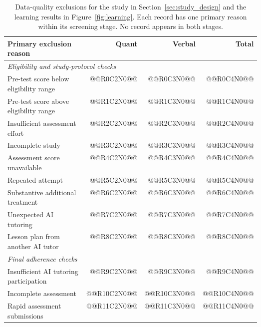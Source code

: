 \begin{table}[H]\centering
\caption{Data-quality exclusions for the study in Section~\ref{sec:study_design} and the learning results in Figure~\ref{fig:learning}. Each record has one primary reason within its screening stage. No record appears in both stages.}\label{tab:data_quality}
\begin{tabular}{p{0.59\linewidth}rrr}\toprule
Primary exclusion reason & Quant & Verbal & Total\\\midrule
\multicolumn{4}{l}{\textit{Eligibility and study-protocol checks}}\\
Pre-test score below eligibility range & @@R0C2N0@@ & @@R0C3N0@@ & @@R0C4N0@@\\
Pre-test score above eligibility range & @@R1C2N0@@ & @@R1C3N0@@ & @@R1C4N0@@\\
Insufficient assessment effort & @@R2C2N0@@ & @@R2C3N0@@ & @@R2C4N0@@\\
Incomplete study & @@R3C2N0@@ & @@R3C3N0@@ & @@R3C4N0@@\\
Assessment score unavailable & @@R4C2N0@@ & @@R4C3N0@@ & @@R4C4N0@@\\
Repeated attempt & @@R5C2N0@@ & @@R5C3N0@@ & @@R5C4N0@@\\
Substantive additional treatment & @@R6C2N0@@ & @@R6C3N0@@ & @@R6C4N0@@\\
Unexpected AI tutoring & @@R7C2N0@@ & @@R7C3N0@@ & @@R7C4N0@@\\
Lesson plan from another AI tutor & @@R8C2N0@@ & @@R8C3N0@@ & @@R8C4N0@@\\
\midrule
\multicolumn{4}{l}{\textit{Final adherence checks}}\\
Insufficient AI tutoring participation & @@R9C2N0@@ & @@R9C3N0@@ & @@R9C4N0@@\\
Incomplete assessment & @@R10C2N0@@ & @@R10C3N0@@ & @@R10C4N0@@\\
Rapid assessment submissions & @@R11C2N0@@ & @@R11C3N0@@ & @@R11C4N0@@\\
\bottomrule
\end{tabular}\end{table}